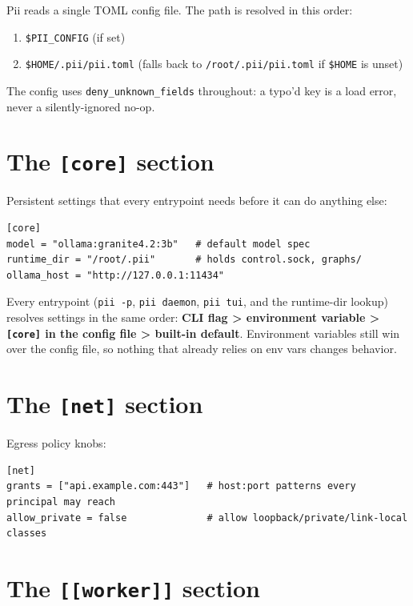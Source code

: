 \documentclass[
	fontsize=10pt,
	twoside=false,
	secnumdepth=2,
	open=any,
]{kaobook}
\begin{document}
Pii reads a single TOML config file. The path is resolved in this order:

\begin{enumerate}
    \item \texttt{\$PII\_CONFIG} (if set)
    \item \texttt{\$HOME/.pii/pii.toml} (falls back to
        \texttt{/root/.pii/pii.toml} if \texttt{\$HOME} is unset)
\end{enumerate}

The config uses \texttt{deny\_unknown\_fields} throughout: a typo'd key is
a load error, never a silently-ignored no-op.

\section{The \texttt{[core]} section}

Persistent settings that every entrypoint needs before it can do anything
else:

\begin{lstlisting}
[core]
model = "ollama:granite4.2:3b"   # default model spec
runtime_dir = "/root/.pii"       # holds control.sock, graphs/
ollama_host = "http://127.0.0.1:11434"
\end{lstlisting}

Every entrypoint (\texttt{pii -p}, \texttt{pii daemon}, \texttt{pii tui},
and the runtime-dir lookup) resolves settings in the same order:
\textbf{CLI flag > environment variable > \texttt{[core]} in the config
file > built-in default}. Environment variables still win over the config
file, so nothing that already relies on env vars changes behavior.

\section{The \texttt{[net]} section}

Egress policy knobs:

\begin{lstlisting}
[net]
grants = ["api.example.com:443"]   # host:port patterns every principal may reach
allow_private = false              # allow loopback/private/link-local classes
\end{lstlisting}

\section{The \texttt{[[worker]]} section}
\end{document}
